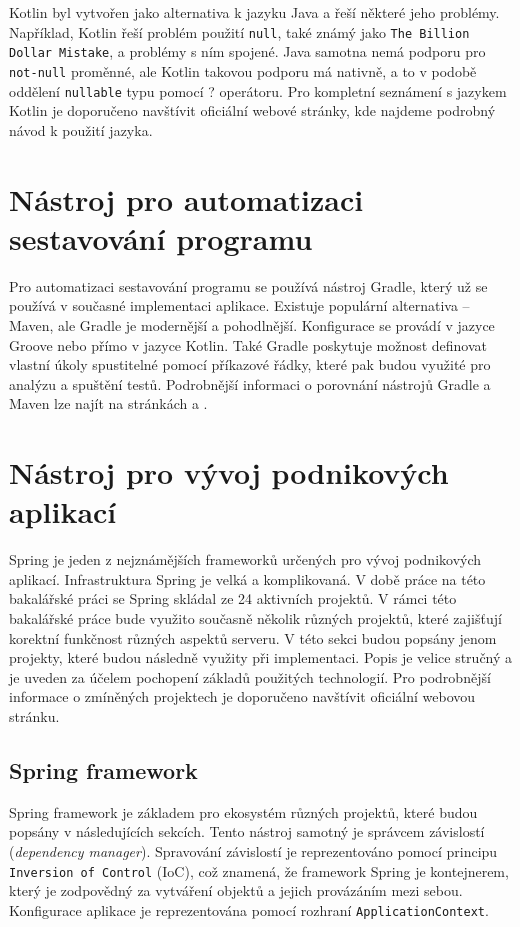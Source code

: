     Kotlin byl vytvořen jako alternativa k jazyku Java a řeší některé jeho problémy. Například, Kotlin řeší problém použití \texttt{null}, také známý jako \texttt{The Billion Dollar Mistake}, a problémy s ním spojené. Java samotna nemá podporu pro \texttt{not-null} proměnné, ale Kotlin takovou podporu má nativně, a to v podobě oddělení \texttt{nullable} typu pomocí ? operátoru. Pro kompletní seznámení s jazykem Kotlin je doporučeno navštívit oficiální webové stránky, kde najdeme podrobný návod k použití jazyka.\cite{kotlin-documentation}
    

\section{Nástroj pro automatizaci sestavování programu}\label{resere:build}
    Pro automatizaci sestavování programu se používá nástroj Gradle, který už se používá v současné implementaci aplikace. Existuje populární alternativa -- Maven, ale Gradle je modernější a pohodlnější. Konfigurace se provádí v jazyce Groove nebo přímo v jazyce Kotlin. Také Gradle poskytuje možnost definovat vlastní úkoly spustitelné pomocí příkazové řádky, které pak budou využité pro analýzu a spuštění testů. Podrobnější informaci o porovnání nástrojů Gradle a Maven lze najít na stránkách \cite{grale-vs-mavem} a \cite{gradle-vs-maven-bealdung}.

\section{Nástroj pro vývoj podnikových aplikací}\label{resere:j2ee}
    Spring je jeden z nejznámějších frameworků určených pro vývoj podnikových aplikací. Infrastruktura Spring je velká a komplikovaná. V době práce na této bakalářské práci se Spring skládal ze 24 aktivních projektů. V rámci této bakalářské práce bude využito současně několik různých projektů, které zajišťují korektní funkčnost různých aspektů serveru. V této sekci budou popsány jenom projekty, které budou následně využity při implementaci. Popis je velice stručný a je uveden za účelem pochopení základů použitých technologií. Pro podrobnější informace o zmíněných projektech je doporučeno navštívit oficiální webovou stránku\cite{spring-projects}.
    
    \subsection{Spring framework}
        Spring framework je základem pro ekosystém různých projektů, které budou popsány v následujících sekcích\cite{spring-framework}. Tento nástroj samotný je správcem závislostí (\textit{dependency manager}). Spravování závislostí je reprezentováno pomocí principu \texttt{Inversion of Control} (IoC), což znamená, že framework Spring je kontejnerem, který je zodpovědný za vytváření objektů a jejich provázáním mezi sebou. Konfigurace aplikace je reprezentována pomocí rozhraní \texttt{ApplicationContext}.
        
